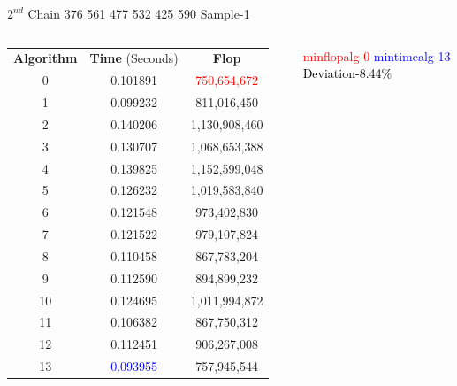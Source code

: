 \documentclass[10pts]{beamer}
\begin{document}
	  
	  
	 \begin{frame}{$2^{nd}$ Chain 376 561 477 532 425 590 \hspace{75pt}   Sample-1 }
	 	\begin{columns}
	 		
	 		\begin{tabular}{c | c | c}
	 			\textbf{Algorithm}  & \textbf{Time} (Seconds) & \textbf{Flop}\\		
	 			0 & 0.101891 &\textcolor{red}{750,654,672}\\ 		
	 			1 &	0.099232 &	811,016,450 \\	
	 			2 &	0.140206 &	1,130,908,460 \\		
	 			3 &	0.130707 &	1,068,653,388\\
	 			4 &	0.139825 &	1,152,599,048 \\		
	 			5 &	0.126232 &	1,019,583,840	\\	
	 			6 &	0.121548 &	973,402,830 	\\	
	 			7 &	0.121522 &	979,107,824	\\	
	 			8 &	0.110458 &	867,783,204	\\	
	 			9 &	0.112590 &	894,899,232 	\\	
	 			10 &	0.124695 &	1,011,994,872 \\		
	 			11 &	0.106382 &	867,750,312 	\\	
	 			12 &	0.112451 &	906,267,008 	\\	
	 			13 &    \textcolor{blue}{0.093955} &757,945,544 		
	 			
	 		\end{tabular}
	 		
	 		
	 		\textcolor{red}{min\textunderscore flop\textunderscore alg-0}
	 		\textcolor{blue}{min\textunderscore time\textunderscore alg-13}
	 		\textcolor{black}{Deviation-8.44\%}
	 	\end{columns}
	 \end{frame} 
	   
	   
	   
	   
\end{document}
